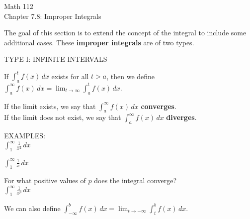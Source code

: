 \documentclass[11pt]{article}
\begin{document}
\begin{center}
\Large
\rm{Math 112}
\\
\rm{Chapter 7.8:  Improper Integrals}
\\
\end{center}
\vspace{0.2in}



The goal of this section is to extend the concept of the integral to include some additional cases.
These {\bf improper integrals} are of two types.

\vspace{0.2in}

TYPE I:  INFINITE INTERVALS \\

\vspace{0.2in}

If $\int_a^tf(x)\, dx$ exists for all $t>a$, then we define $\int_a^{\infty}f(x)\, dx = \lim_{t\to\infty} \int_a^tf(x)\, dx$. \\


\vspace{2in}


If the limit exists, we say that $\int_a^{\infty}f(x)\, dx$ {\bf converges}. \\
If the limit does not exist, we say that $\int_a^{\infty}f(x)\, dx$ {\bf diverges}. \\

\vspace{0.5in}

EXAMPLES:\\

$\int_1^{\infty}\frac{1}{x^2} \, dx$

\vspace{1.5in}


$\int_1^{\infty}\frac{1}{x} \, dx$


\pagebreak





For what positive values of $p$ does the integral converge?\\

$\int_1^{\infty}\frac{1}{x^p} \, dx$


\vspace{2in}


We can also define $\int_{-\infty}^bf(x)\, dx = \lim_{t\to -\infty} \int_t^bf(x)\, dx$. \\

\vspace{0.2in}
\end{document}
